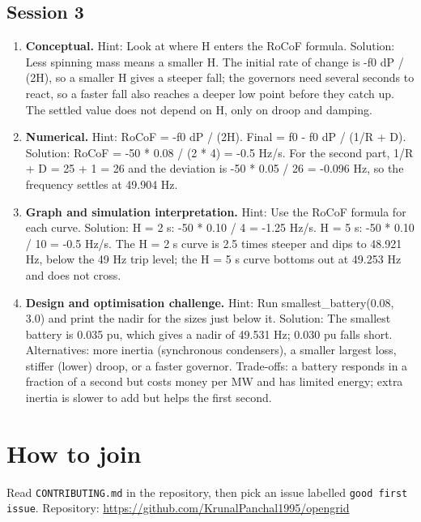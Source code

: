 \documentclass[11pt,a4paper]{article}
\begin{document}
\subsection*{Session 3}
\begin{enumerate}[nosep]
\item \textbf{Conceptual.} Hint: Look at where H enters the RoCoF formula. Solution: Less spinning mass means a smaller H. The initial rate of change is -f0 dP / (2H), so a smaller H gives a steeper fall; the governors need several seconds to react, so a faster fall also reaches a deeper low point before they catch up. The settled value does not depend on H, only on droop and damping.
\item \textbf{Numerical.} Hint: RoCoF = -f0 dP / (2H). Final = f0 - f0 dP / (1/R + D). Solution: RoCoF = -50 * 0.08 / (2 * 4) = -0.5 Hz/s. For the second part, 1/R + D = 25 + 1 = 26 and the deviation is -50 * 0.05 / 26 = -0.096 Hz, so the frequency settles at 49.904 Hz.
\item \textbf{Graph and simulation interpretation.} Hint: Use the RoCoF formula for each curve. Solution: H = 2 s: -50 * 0.10 / 4 = -1.25 Hz/s. H = 5 s: -50 * 0.10 / 10 = -0.5 Hz/s. The H = 2 s curve is 2.5 times steeper and dips to 48.921 Hz, below the 49 Hz trip level; the H = 5 s curve bottoms out at 49.253 Hz and does not cross.
\item \textbf{Design and optimisation challenge.} Hint: Run smallest\_battery(0.08, 3.0) and print the nadir for the sizes just below it. Solution: The smallest battery is 0.035 pu, which gives a nadir of 49.531 Hz; 0.030 pu falls short. Alternatives: more inertia (synchronous condensers), a smaller largest loss, stiffer (lower) droop, or a faster governor. Trade-offs: a battery responds in a fraction of a second but costs money per MW and has limited energy; extra inertia is slower to add but helps the first second.
\end{enumerate}

\section{How to join}
Read \texttt{CONTRIBUTING.md} in the repository, then pick an issue labelled \texttt{good first issue}. Repository: \url{https://github.com/KrunalPanchal1995/opengrid}
\end{document}
